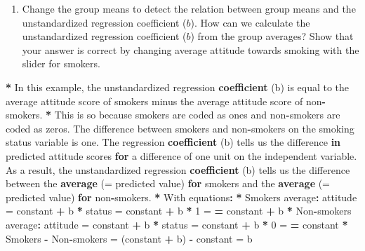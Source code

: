 \documentclass[a4paper]{book}
\newenvironment{Shaded}{\begin{snugshade}}{\end{snugshade}}
\newcommand{\KeywordTok}[1]{\textcolor[rgb]{0,0,0}{\textbf{#1}}}
\newcommand{\DecValTok}[1]{\textcolor[rgb]{0.00,0.00,0.00}{#1}}
\newcommand{\StringTok}[1]{\textcolor[rgb]{0.00,0.00,0.00}{#1}}
\newcommand{\ControlFlowTok}[1]{\textcolor[rgb]{0.00,0.00,0.00}{\textbf{#1}}}
\newcommand{\OperatorTok}[1]{\textcolor[rgb]{0.00,0.00,0.00}{\textbf{#1}}}
\newcommand{\ErrorTok}[1]{\textcolor[rgb]{0.00,0.00,0.00}{\textbf{#1}}}
\newcommand{\NormalTok}[1]{#1}
\providecommand{\tightlist}{%
  \setlength{\itemsep}{0pt}\setlength{\parskip}{0pt}}
\theoremstyle{definition}
\theoremstyle{definition}
\theoremstyle{definition}
\theoremstyle{remark}
\begin{document}
\begin{enumerate}
\def\labelenumi{\arabic{enumi}.}
\setcounter{enumi}{1}
\tightlist
\item
  Change the group means to detect the relation between group means and
  the unstandardized regression coefficient (\(b\)). How can we
  calculate the unstandardized regression coefficient (\(b\)) from the
  group averages? Show that your answer is correct by changing average
  attitude towards smoking with the slider for smokers.
\end{enumerate}

\begin{Shaded}
\begin{Highlighting}[]
\OperatorTok{*}\StringTok{ }\NormalTok{In this example, the unstandardized regression }\KeywordTok{coefficient}\NormalTok{ (b) is equal to}
\NormalTok{the average attitude score of smokers minus the average attitude score of}
\NormalTok{non}\OperatorTok{-}\NormalTok{smokers.}
\OperatorTok{*}\StringTok{ }\NormalTok{This is so because smokers are coded as ones and non}\OperatorTok{-}\NormalTok{smokers are coded as}
\NormalTok{zeros. The difference between smokers and non}\OperatorTok{-}\NormalTok{smokers on the smoking status}
\NormalTok{variable is one. The regression }\KeywordTok{coefficient}\NormalTok{ (b) tells us the difference }\ControlFlowTok{in}
\NormalTok{predicted attitude scores }\ControlFlowTok{for}\NormalTok{ a difference of one unit on the independent}
\NormalTok{variable. As a result, the unstandardized regression }\KeywordTok{coefficient}\NormalTok{ (b) tells us}
\NormalTok{the difference between the }\KeywordTok{average}\NormalTok{ (=}\StringTok{ }\NormalTok{predicted value) }\ControlFlowTok{for}\NormalTok{ smokers and the}
\KeywordTok{average}\NormalTok{ (=}\StringTok{ }\NormalTok{predicted value) }\ControlFlowTok{for}\NormalTok{ non}\OperatorTok{-}\NormalTok{smokers.}
\OperatorTok{*}\StringTok{ }\NormalTok{With equations}\OperatorTok{:}
\ErrorTok{*}\StringTok{ }\NormalTok{Smokers average}\OperatorTok{:}\StringTok{ }\NormalTok{attitude =}\StringTok{ }\NormalTok{constant }\OperatorTok{+}\StringTok{ }\NormalTok{b }\OperatorTok{*}\StringTok{ }\NormalTok{status =}\StringTok{ }\NormalTok{constant }\OperatorTok{+}\StringTok{ }\NormalTok{b }\OperatorTok{*}\StringTok{ }\DecValTok{1}\NormalTok{ =}
\StringTok{  }\ErrorTok{=}\StringTok{ }\NormalTok{constant }\OperatorTok{+}\StringTok{ }\NormalTok{b}
\OperatorTok{*}\StringTok{ }\NormalTok{Non}\OperatorTok{-}\NormalTok{smokers average}\OperatorTok{:}\StringTok{ }\NormalTok{attitude =}\StringTok{ }\NormalTok{constant }\OperatorTok{+}\StringTok{ }\NormalTok{b }\OperatorTok{*}\StringTok{ }\NormalTok{status =}\StringTok{ }\NormalTok{constant }\OperatorTok{+}\StringTok{ }\NormalTok{b }\OperatorTok{*}\StringTok{ }\DecValTok{0}\NormalTok{ =}
\StringTok{  }\ErrorTok{=}\StringTok{ }\NormalTok{constant}
\OperatorTok{*}\StringTok{ }\NormalTok{Smokers }\OperatorTok{-}\StringTok{ }\NormalTok{Non}\OperatorTok{-}\NormalTok{smokers =}\StringTok{ }\NormalTok{(constant }\OperatorTok{+}\StringTok{ }\NormalTok{b) }\OperatorTok{-}\StringTok{ }\NormalTok{constant =}\StringTok{ }\NormalTok{b}
\end{Highlighting}
\end{Shaded}
\end{document}
